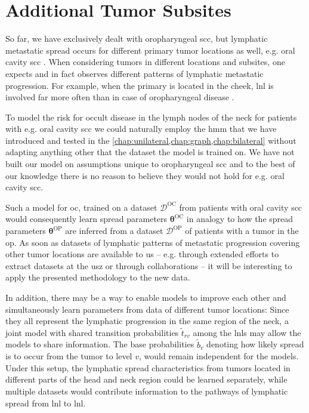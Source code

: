 \documentclass[\relativeRoot/main.tex]{subfiles}
\begin{document}
\section{Additional Tumor Subsites}
\label{sec:future:subsites}

So far, we have exclusively dealt with oropharyngeal \gls{scc}, but lymphatic metastatic spread occurs for different primary tumor locations as well, e.g. oral cavity \acrlong{scc} \cite{shah_patterns_1990,razfar_incidence_2009,woolgar_topography_2007}. When considering tumors in different locations and subsites, one expects and in fact observes different patterns of lymphatic metastatic progression. For example, when the primary is located in the cheek, \gls{lnl} is involved far more often than in case of oropharyngeal disease \cite{woolgar_topography_2007}.

To model the risk for occult disease in the lymph nodes of the neck for patients with e.g. oral cavity \gls{scc} we could naturally employ the \gls{hmm} that we have introduced and tested in the \cref{chap:unilateral,chap:graph,chap:bilateral} without adapting anything other that the dataset the model is trained on. We have not built our model on assumptions unique to oropharyngeal \gls{scc} and to the best of our knowledge there is no reason to believe they would not hold for e.g. oral cavity \gls{scc}.

Such a model for \gls{oc}, trained on a dataset $\boldsymbol{\mathcal{D}}^\text{OC}$ from patients with oral cavity \gls{scc} would consequently learn spread parameters $\boldsymbol{\theta}^\text{OC}$ in analogy to how the spread parameters $\boldsymbol{\theta}^\text{OP}$ are inferred from a dataset $\boldsymbol{\mathcal{D}}^\text{OP}$ of patients with a tumor in the \gls{op}. As soon as datasets of lymphatic patterns of metastatic progression covering other tumor locations are available to us -- e.g. through extended efforts to extract datasets at the \gls{usz} or through collaborations -- it will be interesting to apply the presented methodology to the new data.

In addition, there may be a way to enable models to improve each other and simultaneously learn parameters from data of different tumor locations: Since they all represent the lymphatic progression in the same region of the neck, a joint model with shared transition probabilities $\tilde{t}_{rv}$ among the \glspl{lnl} may allow the models to share information. The base probabilities $\tilde{b}_v$ denoting how likely spread is to occur from the tumor to level $v$, would remain independent for the models. Under this setup, the lymphatic spread characteristics from tumors located in different parts of the head and neck region could be learned separately, while multiple datasets would contribute information to the pathways of lymphatic spread from \gls{lnl} to \gls{lnl}.
\end{document}
